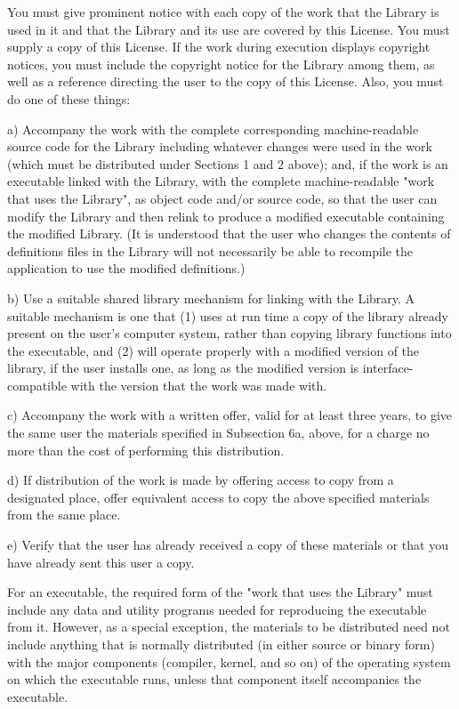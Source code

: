 \documentclass[a4paper,twoside,12pt]{book}
\begin{document}
  You must give prominent notice with each copy of the work that the
Library is used in it and that the Library and its use are covered by
this License.  You must supply a copy of this License.  If the work
during execution displays copyright notices, you must include the
copyright notice for the Library among them, as well as a reference
directing the user to the copy of this License.  Also, you must do one
of these things:

    a) Accompany the work with the complete corresponding
    machine-readable source code for the Library including whatever
    changes were used in the work (which must be distributed under
    Sections 1 and 2 above); and, if the work is an executable linked
    with the Library, with the complete machine-readable "work that
    uses the Library", as object code and/or source code, so that the
    user can modify the Library and then relink to produce a modified
    executable containing the modified Library.  (It is understood
    that the user who changes the contents of definitions files in the
    Library will not necessarily be able to recompile the application
    to use the modified definitions.)

    b) Use a suitable shared library mechanism for linking with the
    Library.  A suitable mechanism is one that (1) uses at run time a
    copy of the library already present on the user's computer system,
    rather than copying library functions into the executable, and (2)
    will operate properly with a modified version of the library, if
    the user installs one, as long as the modified version is
    interface-compatible with the version that the work was made with.

    c) Accompany the work with a written offer, valid for at
    least three years, to give the same user the materials
    specified in Subsection 6a, above, for a charge no more
    than the cost of performing this distribution.

    d) If distribution of the work is made by offering access to copy
    from a designated place, offer equivalent access to copy the above
    specified materials from the same place.

    e) Verify that the user has already received a copy of these
    materials or that you have already sent this user a copy.

  For an executable, the required form of the "work that uses the
Library" must include any data and utility programs needed for
reproducing the executable from it.  However, as a special exception,
the materials to be distributed need not include anything that is
normally distributed (in either source or binary form) with the major
components (compiler, kernel, and so on) of the operating system on
which the executable runs, unless that component itself accompanies
the executable.
\end{document}
